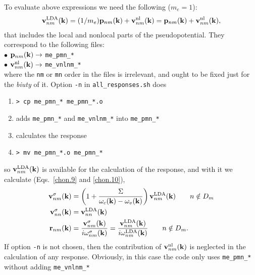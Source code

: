 To evaluate above expressions we need the following ($m_e=1$):
\begin{align}\label{}
\mathbf{v}^{\mathrm{LDA}}_{nm}(\mathbf{k}) 
=(1/m_e)\mathbf{p}_{nm}(\mathbf{k})+\mathbf{v}^{\mathrm{nl}}_{nm}(\mathbf{k})
=\mathbf{p}_{nm}(\mathbf{k})+\mathbf{v}^{\mathrm{nl}}_{nm}(\mathbf{k})
,
\end{align}
that
 includes the local and nonlocal parts of the pseudopotential. They
 correspond to the following files:\\
$\bullet$ $\mathbf{p}_{nm}(\mathbf{k})\to$ \verb=me_pmn_*=\\
$\bullet$ $\mathbf{v}^{\mathrm{nl}}_{nm}(\mathbf{k})\to$ \verb=me_vnlnm_*=\\
where the \verb=nm= or \verb=mn= order in the files is irrelevant, and
ought to be fixed just for the {\it biuty} of it.
Option \verb=-n= in \verb=all_responses.sh= does
\begin{enumerate}
\item 
 \verb=> cp me_pmn_* me_pmn_*.o= 
\item adds \verb=me_pmn_*= and \verb=me_vnlnm_*= into
  \verb=me_pmn_*= 
\item calculates the response
\item \verb=> mv me_pmn_*.o me_pmn_*=
\end{enumerate}
so   
$\mathbf{v}^{\mathrm{LDA}}_{nm}(\mathbf{k})$
is available for the calculation of the response, and with it we calculate
(Eqs.~\eqref{chon.9} and \eqref{chon.10}),
\begin{align}\label{c-chon.98}
\mathbf{v}^\sigma_{nm}(\mathbf{k})
&=
\left(1+\frac{\Sigma}{\omega_c(\mathbf{k})-\omega_v(\mathbf{k})}\right)\mathbf{v}^{\mathrm{LDA}}_{nm}(\mathbf{k})
\quad\quad n\notin D_m
\nonumber\\
\mathbf{v}^\sigma_{nn}(\mathbf{k})
&=
\mathbf{v}^{\mathrm{LDA}}_{nn}(\mathbf{k})
\nonumber\\
\mathbf{r}_{nm}(\mathbf{k})&=\frac{\mathbf{v}^\sigma_{nm}(\mathbf{k})}{i\omega^\sigma_{nm}(\mathbf{k})}
=\frac{\mathbf{v}^{\mathrm{LDA}}_{nm}(\mathbf{k})}{i\omega^{\mathrm{LDA}}_{nm}(\mathbf{k})}
\quad\quad n\notin D_m
.
\end{align}   
If option \verb=-n= is not chosen, then the contribution of $\mathbf{v}^{\mathrm{nl}}_{nm}(\mathbf{k})$
is neglected in the calculation of any response. Obviously, in this
case the code only uses \verb=me_pmn_*= without adding \verb=me_vnlnm_*= 

